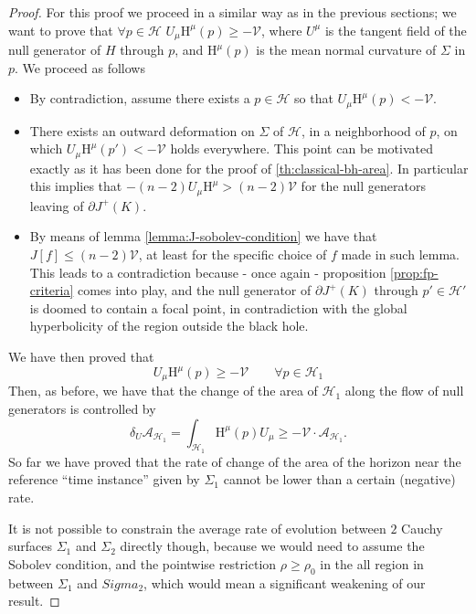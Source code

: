 \begin{proof}
	For this proof we proceed in a similar way as in the previous sections; we want to prove that \(\forall p \in \mathscr{H}\) \(U_{\mu}\mathrm{H}^{\mu}(p) \ge -\mathcal{V}\), where \(U^{\mu}\) is the tangent field of the null generator of \(H\) through \(p\), and \(\mathrm{H}^{\mu}(p)\) is the mean normal curvature of \(\Sigma\) in \(p\). We proceed as follows
	\begin{itemize}
		\item[\ding{99}] By contradiction, assume there exists a \(p\in \mathscr{H}\) so that \(U_{\mu}\mathrm{H}^{\mu}(p) < -\mathcal{V}\).
  		\item[\ding{99}] There exists an outward deformation on \(\Sigma\) of \(\mathscr{H}\), in a neighborhood of \(p\), on which \(U_{\mu}\mathrm{H}^{\mu}(p') < -\mathcal{V}\) holds everywhere. This point can be motivated exactly as it has been done for the proof of \ref{th:classical-bh-area}. In particular this implies that \(-(n -2) U_{\mu}\mathrm{H}^{\mu} > (n-2)\mathcal{V}\) for the null generators leaving of \(\partial J^+(K)\).
    	\item[\ding{99}] By means of lemma \ref{lemma:J-sobolev-condition} we have that \(J[f] \le (n - 2)\mathcal{V}\), at least for the specific choice of \(f\) made in such lemma. This leads to a contradiction because - once again - proposition \ref{prop:fp-criteria} comes into play, and the null generator of \(\partial J^+(K)\) through \(p'\in \mathscr{H}'\) is doomed to contain a focal point, in contradiction with the global hyperbolicity of the region outside the black hole.
	\end{itemize}
	We have then proved that 
	\[
		U_{\mu}\mathrm{H}^{\mu}(p) \ge -\mathcal{V}	\quad\quad \forall p \in \mathscr{H}_1
	\]
	Then, as before, we have that the change of the area of \(\mathscr{H}_1\) along the flow of null generators is controlled by
	\begin{equation*}
		\delta_U\mathcal{A}_{\mathscr{H}_1} = \int_{\mathscr{H}_1} \mathrm{H}^{\mu}(p)U_{\mu} \ge - \mathcal{V}\cdot\mathcal{A}_{\mathscr{H}_1}.
	\end{equation*}
	So far we have proved that the rate of change of the area of the horizon near the reference ``time instance'' given by \(\Sigma_1\) cannot be lower than a certain (negative) rate. 
	
	It is not possible to constrain the average rate of evolution between \(2\) Cauchy surfaces \(\Sigma_1\) and \(\Sigma_2\) directly though, because we would need to assume the Sobolev condition, and the pointwise restriction \(\rho \ge \rho_0\) in the all region in between \(\Sigma_1\) and \(Sigma_2\), which would mean a significant weakening of our result.

\end{proof}

